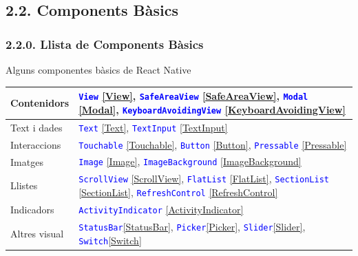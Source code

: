 \documentclass[12pt]{beamer}
\begin{document}
	\subsection{2.2. Components Bàsics}
	\subsubsection{2.2.0. Llista de Components Bàsics}
	\begin{frame}
		\begin{block}{Alguns componentes bàsics de React Native}
			\begin{table}[h!]
				\centering
				\begin{tabularx}{\textwidth}{|C{0.2\textwidth}|L{\dimexpr{}\arrayrulewidth}}
					\hline
					Contenidors & 
					\textcolor{blue}{\texttt{View}} \ref{View}, 
					\textcolor{blue}{\texttt{SafeAreaView}} \ref{SafeAreaView}, 
					\textcolor{blue}{\texttt{Modal}} \ref{Modal},
					\textcolor{blue}{\texttt{KeyboardAvoidingView}} \ref{KeyboardAvoidingView} \\ \hline
					Text i dades & 
					\textcolor{blue}{\texttt{Text}} \ref{Text}, 
					\textcolor{blue}{\texttt{TextInput}} \ref{TextInput} \\ \hline
					Interaccions & 
					\textcolor{blue}{\texttt{Touchable}} \ref{Touchable},
					\textcolor{blue}{\texttt{Button}} \ref{Button},  
					\textcolor{blue}{\texttt{Pressable}} \ref{Pressable} \\ \hline
					Imatges & 
					\textcolor{blue}{\texttt{Image}} \ref{Image}, 
					\textcolor{blue}{\texttt{ImageBackground}} \ref{ImageBackground} \\ \hline
					Llistes & 
					\textcolor{blue}{\texttt{ScrollView}} \ref{ScrollView}, 
					\textcolor{blue}{\texttt{FlatList}} \ref{FlatList}, 
					\textcolor{blue}{\texttt{SectionList}} \ref{SectionList}, 
					\textcolor{blue}{\texttt{RefreshControl}} \ref{RefreshControl} \\ \hline
					Indicadors & 
					\textcolor{blue}{\texttt{ActivityIndicator}} \ref{ActivityIndicator} \\ \hline
					Altres visual & 
					\textcolor{blue}{\texttt{StatusBar}}\ref{StatusBar}, 
					\textcolor{blue}{\texttt{Picker}}\ref{Picker}, 
					\textcolor{blue}{\texttt{Slider}}\ref{Slider},
					\textcolor{blue}{\texttt{Switch}}\ref{Switch}\\ \hline
				\end{tabularx}
			\end{table}
		\end{block}
	\end{frame}
\end{document}
